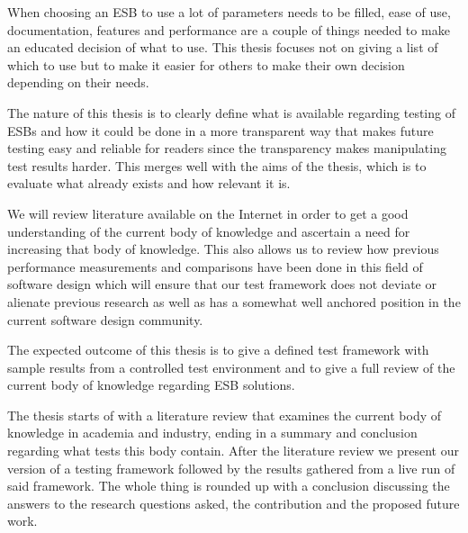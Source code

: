 When choosing an ESB to use a lot of parameters needs to be filled, ease of use, documentation, features and performance are a couple of things needed to make an educated decision of what to use. 
This thesis focuses not on giving a list of which to use but to make it easier for others to make their own decision depending on their needs.

The nature of this thesis is to clearly define what is available regarding testing of ESBs and how it could be done in a more transparent way that makes future testing easy and reliable for readers since the transparency makes manipulating test results harder. 
This merges well with the aims of the thesis, which is to evaluate what already exists and how relevant it is.

We will review literature available on the Internet in order to get a good understanding of the current body of knowledge and ascertain a need for increasing that body of knowledge. 
This also allows us to review how previous performance measurements and comparisons have been done in this field of software design which will ensure that our test framework does not deviate or alienate previous research as well as has a somewhat well anchored position in the current software design community.

The expected outcome of this thesis is to give a defined test framework with sample results from a controlled test environment and to give a full review of the current body of knowledge regarding ESB solutions.

The thesis starts of with a literature review that examines the current body of knowledge in academia and industry, ending in a summary and conclusion regarding what tests this body contain.
After the literature review we present our version of a testing framework followed by the results gathered from a live run of said framework.
The whole thing is rounded up with a conclusion discussing the answers to the research questions asked, the contribution and the proposed future work.
